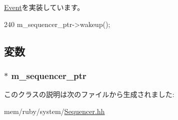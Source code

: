 \hyperlink{classEvent_a142b75b68a6291400e20fb0dd905b1c8}{Event}を実装しています。


\begin{DoxyCode}
240 { m_sequencer_ptr->wakeup(); }
\end{DoxyCode}


\subsection{変数}
\hypertarget{classSequencer_1_1SequencerWakeupEvent_a67a78e02404a00d58ba9d94bdc85e0e4}{
\subsubsection[{m\_\-sequencer\_\-ptr}]{$\ast$ {\bf m\_\-sequencer\_\-ptr}}}
\label{classSequencer_1_1SequencerWakeupEvent_a67a78e02404a00d58ba9d94bdc85e0e4}


このクラスの説明は次のファイルから生成されました:\begin{DoxyCompactItemize}
\item 
mem/ruby/system/\hyperlink{Sequencer_8hh}{Sequencer.hh}\end{DoxyCompactItemize}
